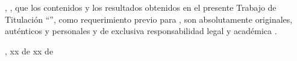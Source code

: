 
\UTIAutoresPronombre, \UTIAutoresTexto, \UTIVerboDeclaro{} que los contenidos y los resultados obtenidos en el presente Trabajo de Titulación ``\UTITituloProyecto'', como requerimiento previo para \UTIFraseObtencionTituloProfesional{}, son absolutamente originales, auténticos y personales y de exclusiva responsabilidad legal y académica \UTIAutoresResponsabilidad.

\vspace{1.5cm}

{\raggedleft
\UTICiudadPais, xx de xx de \UTIAnio\par}

\vspace{2.5cm}

\UTIFirmasAutoresBloque
